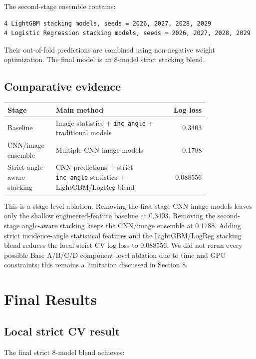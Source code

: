 \documentclass[11pt]{article}
\begin{document}
The second-stage ensemble contains:

\begin{lstlisting}
4 LightGBM stacking models, seeds = 2026, 2027, 2028, 2029
4 Logistic Regression stacking models, seeds = 2026, 2027, 2028, 2029
\end{lstlisting}

Their out-of-fold predictions are combined using non-negative weight optimization. The final model is an 8-model strict stacking blend.

\subsection{Comparative evidence}

\begin{center}
\begin{tabular}{p{0.24\linewidth}p{0.56\linewidth}r}
\toprule
Stage & Main method & Log loss \\
\midrule
Baseline & Image statistics + \texttt{inc\_angle} + traditional models & 0.3403 \\
CNN/image ensemble & Multiple CNN image models & 0.1788 \\
Strict angle-aware stacking & CNN predictions + strict \texttt{inc\_angle} statistics + LightGBM/LogReg blend & 0.088556 \\
\bottomrule
\end{tabular}
\end{center}

This is a stage-level ablation. Removing the first-stage CNN image models leaves only the shallow engineered-feature baseline at 0.3403. Removing the second-stage angle-aware stacking keeps the CNN/image ensemble at 0.1788. Adding strict incidence-angle statistical features and the LightGBM/LogReg stacking blend reduces the local strict CV log loss to 0.088556. We did not rerun every possible Base A/B/C/D component-level ablation due to time and GPU constraints; this remains a limitation discussed in Section 8.

\section{Final Results}

\subsection{Local strict CV result}

The final strict 8-model blend achieves:
\end{document}
